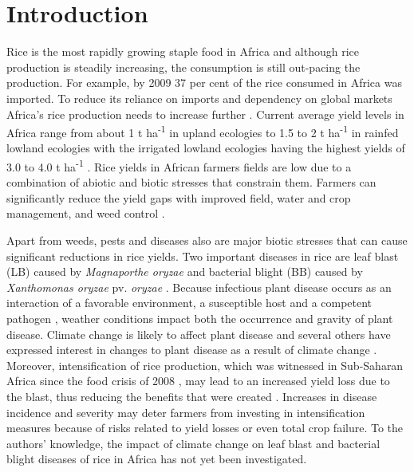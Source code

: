 \section{Introduction}
\label{intro}
Rice is the most rapidly growing staple food in Africa and although rice production is steadily increasing, the consumption is still out-pacing the production. For example, by 2009 37 per cent of the rice consumed in Africa was imported. To reduce its reliance on imports and dependency on global markets Africa's rice production needs to increase further \citep{Seck2013}. Current average yield levels in Africa range from about 1 t ha\textsuperscript{-1} in upland ecologies to 1.5 to 2 t ha\textsuperscript{-1} in rainfed lowland ecologies with the irrigated lowland ecologies having the highest yields of 3.0 to 4.0 t ha\textsuperscript{-1} \citep{Diagne2013}. Rice yields in African farmers fields are low due to a combination of abiotic and biotic stresses that constrain them. Farmers can significantly reduce the yield gaps with improved field, water and crop management, and weed control \citep{Saito2013}.
    
    Apart from weeds, pests and diseases also are major biotic stresses that can cause significant reductions in rice yields. Two important diseases in rice are leaf blast (LB) caused by \textit{Magnaporthe oryzae} and bacterial blight (BB) caused by \textit{Xanthomonas oryzae} pv. \textit{oryzae} \citep{Verdier2012}. Because infectious plant disease occurs as an interaction of a favorable environment, a susceptible host and a competent pathogen \citep{Madden2007}, weather conditions impact both the occurrence and gravity of plant disease. Climate change is likely to affect plant disease \citep{Anderson2004,Coakley1999,Garrett2006} and several others have expressed interest in changes to plant disease as a result of climate change \citep{Chakraborty2011,Juroszek2011,Luck2011,Pautasso2010,Savary2011,Sutherst2011}. Moreover, intensification of rice production, which was witnessed in Sub-Saharan Africa since the food crisis of 2008 \citep{Saito2013}, may lead to an increased yield loss due to the blast, thus reducing the benefits that were created \citep{Sere2013}. Increases in disease incidence and severity may deter farmers from investing in intensification measures because of risks related to yield losses or even total crop failure. To the authors' knowledge, the impact of climate change on leaf blast and bacterial blight diseases of rice in Africa has not yet been investigated.
    
